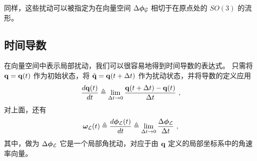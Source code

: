 同样，这些扰动可以被指定为在向量空间 $\Delta{\bm \phi}_{\mathcal{G}}$ 相切于在原点处的 $SO(3)$ 的流形。

\subsection{时间导数}

在向量空间中表示局部扰动，我们可以很容易地得到时间导数的表达式。 
只需将 ${\bf q}={\bf q}(t)$ 作为初始状态，将 $\tilde{{\bf q}}={\bf q}(t+\Delta t)$ 作为扰动状态，并将导数的定义应用
%
\begin{align}
\frac{d{\bf q}(t)}{dt} \triangleq \lim_{\Delta t\to0} \frac{{\bf q}(t+\Delta t)-{\bf q}(t)}{\Delta t}~, \label{equ:derivative}
\end{align}%
%
对上面，还有
%
\begin{align}
{\bm \omega}_{\mathcal{L}}(t) \triangleq \frac{d{\bm \phi}_{\mathcal{L}}(t)}{dt} \triangleq \lim_{\Delta t\to0} \frac{\Delta{\bm \phi}_{\mathcal{L}}}{\Delta t}~,
\end{align}%
%
其中，做为 $\Delta{\bm \phi}_{\mathcal{L}}$ 它是一个局部角扰动，对应于由 ${\bf q}$ 定义的局部坐标系中的角速率向量。

